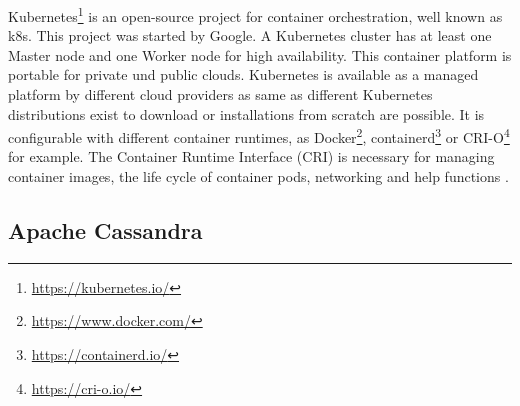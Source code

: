Kubernetes\footnote{\url{https://kubernetes.io/}} is an open-source project for container orchestration, well known as k8s. This project was started by Google. A Kubernetes cluster has at least one Master node and one Worker node for high availability. This container platform is portable for private und public clouds. Kubernetes is available as a managed platform by different cloud providers as same as different Kubernetes distributions exist to download or installations from scratch are possible. It is configurable with different container runtimes, as Docker\footnote{\url{https://www.docker.com/}}, containerd\footnote{\url{https://containerd.io/}} or CRI-O\footnote{\url{https://cri-o.io/}} for example. The Container Runtime Interface (CRI) is necessary for managing container images, the life cycle of container pods, networking and help functions \cite[~p.16]{Scholl2019}. 


\subsection{Apache Cassandra}

